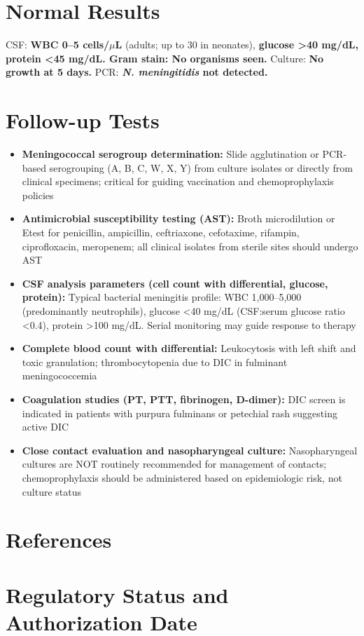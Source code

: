 \section*{Normal Results}
CSF: \textbf{WBC 0--5 cells/$\mu$L} (adults; up to 30 in neonates), \textbf{glucose >40 mg/dL, protein <45 mg/dL. Gram stain: No organisms seen.} Culture: \textbf{No growth at 5 days.} PCR: \textbf{\textit{N. meningitidis} not detected.}

\section*{Follow-up Tests}
\begin{itemize}
  \item \textbf{Meningococcal serogroup determination:} Slide agglutination or PCR-based serogrouping (A, B, C, W, X, Y) from culture isolates or directly from clinical specimens; critical for guiding vaccination and chemoprophylaxis policies \cite{cohn2013prevention}
  \item \textbf{Antimicrobial susceptibility testing (AST):} Broth microdilution or Etest for penicillin, ampicillin, ceftriaxone, cefotaxime, rifampin, ciprofloxacin, meropenem; all clinical isolates from sterile sites should undergo AST
  \item \textbf{CSF analysis parameters (cell count with differential, glucose, protein):} Typical bacterial meningitis profile: WBC 1,000--5,000 (predominantly neutrophils), glucose <40 mg/dL (CSF:serum glucose ratio <0.4), protein >100 mg/dL. Serial monitoring may guide response to therapy
  \item \textbf{Complete blood count with differential:} Leukocytosis with left shift and toxic granulation; thrombocytopenia due to DIC in fulminant meningococcemia
  \item \textbf{Coagulation studies (PT, PTT, fibrinogen, D-dimer):} DIC screen is indicated in patients with purpura fulminans or petechial rash suggesting active DIC
  \item \textbf{Close contact evaluation and nasopharyngeal culture:} Nasopharyngeal cultures are NOT routinely recommended for management of contacts; chemoprophylaxis should be administered based on epidemiologic risk, not culture status
\end{itemize}

\section*{References}



\clearpage
\section*{Regulatory Status and Authorization Date}

\clearpage
